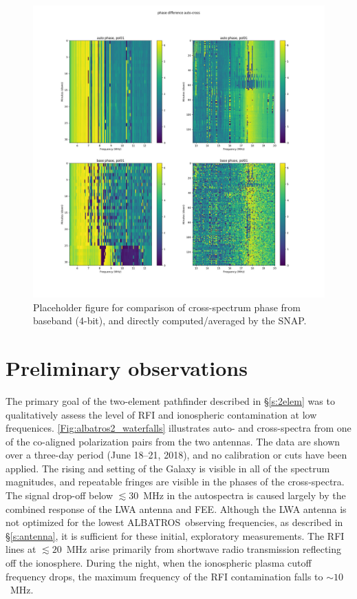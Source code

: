 \documentclass{ws-jai}
\def\albatros{ALBATROS}
\begin{document}
\begin{figure}[t]
  \begin{center}
    \includegraphics[width=0.8\linewidth]{Figures/baseband_direct_phase_compare.jpg}
    \caption{Placeholder figure for comparison of cross-spectrum phase from
      baseband (4-bit), and directly computed/averaged by the SNAP.}
    \label{Fig:baseband_direct_phase}
  \end{center}
\end{figure}

\section{Preliminary observations}

The primary goal of the two-element pathfinder described in
\S\ref{s:2elem} was to qualitatively assess the level of RFI and
ionospheric contamination at low frequenices.
\autoref{Fig:albatros2_waterfalls} illustrates auto- and cross-spectra
from one of the co-aligned polarization pairs from the two antennas.
The data are shown over a three-day period (June 18--21, 2018), and no
calibration or cuts have been applied.  The rising and setting of the
Galaxy is visible in all of the spectrum magnitudes, and repeatable
fringes are visible in the phases of the cross-spectra.  The signal
drop-off below $\lesssim30$~MHz in the autospectra is caused largely
by the combined response of the LWA antenna and FEE.  Although the LWA
antenna is not optimized for the lowest \albatros\ observing
frequencies, as described in \S\ref{s:antenna}, it is sufficient for
these initial, exploratory measurements.  The RFI lines at
$\lesssim20$~MHz arise primarily from shortwave radio transmission
reflecting off the ionosphere.  During the night, when the ionospheric
plasma cutoff frequency drops, the maximum frequency of the RFI
contamination falls to $\sim10$~MHz.
\end{document}
